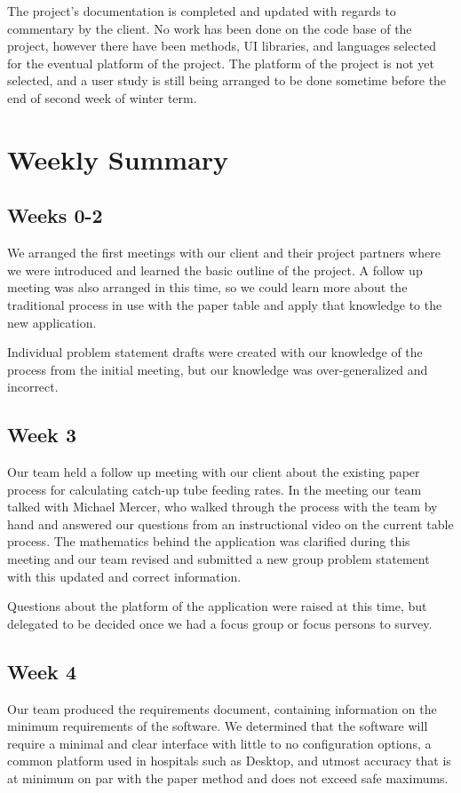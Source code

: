 \documentclass[onecolumn, draftclsnofoot,10pt, compsoc]{IEEEtran}
\begin{document}
The project's documentation is completed and updated with regards to commentary by the client.
No work has been done on the code base of the project, however there have been methods, UI libraries, and languages selected for the eventual platform of the project.
The platform of the project is not yet selected, and a user study is still being arranged to be done sometime before the end of second week of winter term.
\section{Weekly Summary}
\subsection{Weeks 0-2}
We arranged the first meetings with our client and their project partners where we were introduced and learned the basic outline of the project.
A follow up meeting was also arranged in this time, so we could learn more about the traditional process in use with the paper table and apply that knowledge to the new application.

Individual problem statement drafts were created with our knowledge of the process from the initial meeting, but our knowledge was over-generalized and incorrect.
\subsection{Week 3}
Our team held a follow up meeting with our client about the existing paper process for calculating catch-up tube feeding rates.
In the meeting our team talked with Michael Mercer, who walked through the process with the team by hand and answered our questions from an instructional video on the current table process.
The mathematics behind the application was clarified during this meeting and our team revised and submitted a new group problem statement with this updated and correct information.

Questions about the platform of the application were raised at this time, but delegated to be decided once we had a focus group or focus persons to survey.
\subsection{Week 4}
Our team produced the requirements document, containing information on the minimum requirements of the software.
We determined that the software will require a minimal and clear interface with little to no configuration options, a common platform used in hospitals such as Desktop, and utmost accuracy that is at minimum on par with the paper method and does not exceed safe maximums.
\end{document}

